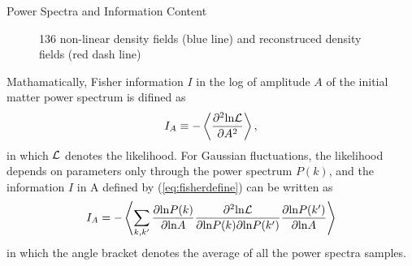 \begin{section}{Power Spectra and Information Content}
\begin{figure}
{136 non-linear density fields (blue line) and reconstruced density fields (red dash line)}
\label{fig:cross-correlation-power}
\end{figure}

   Mathamatically, Fisher information \cite{bib:Tegmark1997} $I$ in the log of amplitude $A$ of the initial 
matter power spectrum is difined as 
\begin{align}
   I_A \equiv -\left\langle \frac{\partial ^2 \mathrm{ln \mathcal{L}}}{\partial A ^2}\right\rangle,
\label{eq:fisherdefine}
\end{align}
   in which $\mathcal{L}$ denotes the likelihood. For Gaussian fluctuations, the likelihood depends on
parameters only through the power spectrum $P(k)$, and the information $I$ in A defined by (\ref{eq:fisherdefine})
can be written as \cite{bib:Rimes2006}
\begin{align}
    I_A = - \left\langle \sum_{k,k'} \frac{\partial \mathrm{ln} P(k)}{\partial \mathrm{ln} A} 
\frac{\partial ^2 \mathrm{ln \mathcal{L}}}{\partial \mathrm{ln} P(k) \partial \mathrm{ln} P(k')}
\frac{\partial \mathrm{ln} P(k')}{\partial \mathrm{ln} A}\right\rangle
\label{eq:fisherdefineforgaussian}
\end{align}
in which the angle bracket denotes the average of all the power spectra samples.


\end{section}

